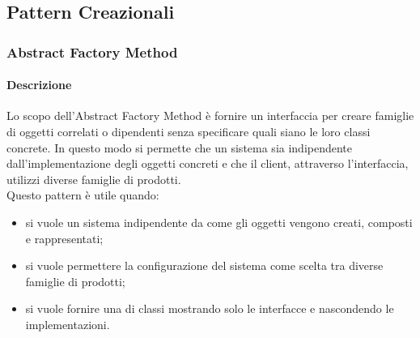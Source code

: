 \newpage
\subsection{Pattern Creazionali}
\subsubsection{Abstract Factory Method}
\paragraph{Descrizione}
Lo scopo dell'Abstract Factory Method è fornire un interfaccia per creare famiglie di oggetti correlati o dipendenti senza specificare quali siano le loro classi concrete.
In questo modo si permette che un sistema sia indipendente dall'implementazione degli oggetti concreti e che il client, attraverso l'interfaccia, utilizzi diverse famiglie di prodotti.
\\Questo pattern è utile quando:
\begin{itemize}
	\item 	si vuole un sistema indipendente da come gli oggetti vengono creati, composti e rappresentati;
	\item 	si vuole permettere la configurazione del sistema come scelta tra diverse famiglie di prodotti;
	\item 	si vuole fornire una  di classi mostrando solo le interfacce e nascondendo le implementazioni.
\end{itemize}
